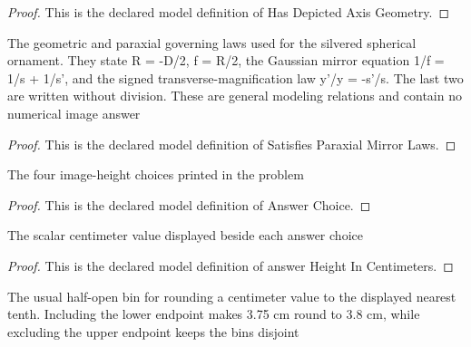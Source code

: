 \begin{proof}
  This is the declared model definition of Has Depicted Axis Geometry.
\end{proof}
\begin{definition}
  \label{def:physics:phyx-mini-0039:phyxminiproblems-problemphyxmini0039-satisfiesparaxialmirrorlaws}
  The geometric and paraxial governing laws used for the silvered spherical ornament. They state R = -D/2, f = R/2, the Gaussian mirror equation 1/f = 1/s + 1/s', and the signed transverse-magnification law y'/y = -s'/s. The last two are written without division. These are general modeling relations and contain no numerical image answer
\end{definition}
\begin{proof}
  This is the declared model definition of Satisfies Paraxial Mirror Laws.
\end{proof}
\begin{definition}
  \label{def:physics:phyx-mini-0039:phyxminiproblems-problemphyxmini0039-answerchoice}
  The four image-height choices printed in the problem
\end{definition}
\begin{proof}
  This is the declared model definition of Answer Choice.
\end{proof}
\begin{definition}
  \label{def:physics:phyx-mini-0039:phyxminiproblems-problemphyxmini0039-answerheightincentimeters}
  The scalar centimeter value displayed beside each answer choice
\end{definition}
\begin{proof}
  This is the declared model definition of answer Height In Centimeters.
\end{proof}
\begin{definition}
  \label{def:physics:phyx-mini-0039:phyxminiproblems-problemphyxmini0039-roundstonearesttenth}
  The usual half-open bin for rounding a centimeter value to the displayed nearest tenth. Including the lower endpoint makes 3.75 cm round to 3.8 cm, while excluding the upper endpoint keeps the bins disjoint
\end{definition}
